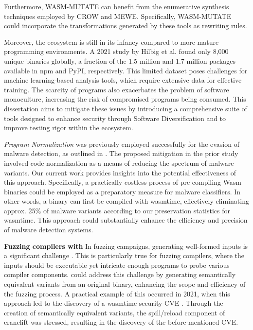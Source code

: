 Furthermore, WASM-MUTATE can benefit from the enumerative synthesis techniques employed by CROW and MEWE. 
Specifically, WASM-MUTATE could incorporate the transformations generated by these tools as rewriting rules.

Moreover, the \Wasm ecosystem is still in its infancy compared to more mature programming environments. 
A 2021 study by Hilbig et al. found only 8,000 unique \Wasm binaries globally\cite{Hilbig2021AnES}, a fraction of the 1.5 million and 1.7 million packages available in npm and PyPI, respectively. 
This limited dataset poses challenges for machine learning-based analysis tools, which require extensive data for effective training. 
The scarcity of \Wasm programs also exacerbates the problem of software monoculture, increasing the risk of compromised \Wasm programs being consumed\cite{usenixWasm2020}. 
This dissertation aims to mitigate these issues by introducing a comprehensive suite of tools designed to enhance \Wasm security through Software Diversification and to improve testing rigor within the ecosystem.


\emph{Program Normalization}
\tool was previously employed successfully for the evasion of malware detection, as outlined in \cite{CABRERAARTEAGA2023103296}. 
The proposed mitigation in the prior study involved code normalization as a means of reducing the spectrum of malware variants. 
Our current work provides insights into the potential effectiveness of this approach. 
Specifically, a practically costless process of pre-compiling Wasm binaries could be employed as a preparatory measure for malware classifiers. 
In other words, a \wasm binary can first be compiled with wasmtime, effectively eliminating approx. 25\% of malware variants according to our preservation statistics for wasmtime. 
This approach could substantially enhance the efficiency and precision of malware detection systems.

\textbf{Fuzzing \Wasm compilers with \tool}
In fuzzing campaigns, generating well-formed inputs is a significant challenge \cite{7958599}. 
This is particularly true for fuzzing compilers, where the inputs should be executable yet intricate enough programs to probe various compiler components. 
\tool could address this challenge by generating semantically equivalent variants from an original \wasm binary, enhancing the scope and efficiency of the fuzzing process. 
A practical example of this occurred in 2021, when this approach led to the discovery of a wasmtime security CVE \cite{CVE}. 
Through the creation of semantically equivalent variants, the spill/reload component of cranelift was stressed, resulting in the discovery of the before-mentioned CVE.



